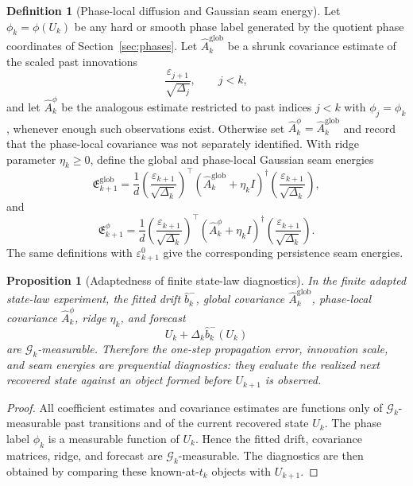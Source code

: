 \documentclass[11pt,a4paper]{amsart}
\theoremstyle{plain}
\newtheorem{proposition}[theorem]{Proposition}
\theoremstyle{definition}
\newtheorem{definition}[theorem]{Definition}
\theoremstyle{remark}
\newcommand{\cG}{\mathcal{G}}
\begin{document}
\begin{definition}[Phase-local diffusion and Gaussian seam energy]\label{def:phase-local-seam}
Let \(\phi_k=\phi(U_k)\) be any hard or smooth phase label generated by the quotient phase
coordinates of Section~\ref{sec:phases}.  Let \(\widehat A_k^{\mathrm{glob}}\) be a shrunk
covariance estimate of the scaled past innovations
\[
        \frac{\varepsilon_{j+1}}{\sqrt{\Delta_j}},
        \qquad j<k,
\]
and let \(\widehat A_k^{\phi}\) be the analogous estimate restricted to past indices
\(j<k\) with \(\phi_j=\phi_k\), whenever enough such observations exist.  Otherwise set
\(\widehat A_k^\phi=\widehat A_k^{\mathrm{glob}}\) and record that the phase-local covariance
was not separately identified.  With ridge parameter \(\eta_k\ge0\), define the global and
phase-local Gaussian seam energies
\[
        \mathfrak E_{k+1}^{\mathrm{glob}}
        =
        \frac1d
        \left(\frac{\varepsilon_{k+1}}{\sqrt{\Delta_k}}\right)^\top
        \left(\widehat A_k^{\mathrm{glob}}+\eta_k I\right)^\dagger
        \left(\frac{\varepsilon_{k+1}}{\sqrt{\Delta_k}}\right),
\]
and
\[
        \mathfrak E_{k+1}^{\phi}
        =
        \frac1d
        \left(\frac{\varepsilon_{k+1}}{\sqrt{\Delta_k}}\right)^\top
        \left(\widehat A_k^{\phi}+\eta_k I\right)^\dagger
        \left(\frac{\varepsilon_{k+1}}{\sqrt{\Delta_k}}\right).
\]
The same definitions with \(\varepsilon_{k+1}^{0}\) give the corresponding persistence seam
energies.
\end{definition}

\begin{proposition}[Adaptedness of finite state-law diagnostics]\label{prop:finite-state-law-adapted}
In the finite adapted state-law experiment, the fitted drift
\(\widehat b_k^-\), global covariance \(\widehat A_k^{\mathrm{glob}}\), phase-local covariance
\(\widehat A_k^\phi\), ridge \(\eta_k\), and forecast
\[
        U_k+\Delta_k\widehat b_k^-(U_k)
\]
are \(\cG_k\)-measurable.  Therefore the one-step propagation error, innovation scale, and seam
energies are prequential diagnostics: they evaluate the realized next recovered state against an
object formed before \(U_{k+1}\) is observed.
\end{proposition}

\begin{proof}
All coefficient estimates and covariance estimates are functions only of \(\cG_k\)-measurable
past transitions and of the current recovered state \(U_k\).  The phase label \(\phi_k\) is a
measurable function of \(U_k\).  Hence the fitted drift, covariance matrices, ridge, and forecast
are \(\cG_k\)-measurable.  The diagnostics are then obtained by comparing these known-at-\(t_k\)
objects with \(U_{k+1}\).
\end{proof}
\end{document}
